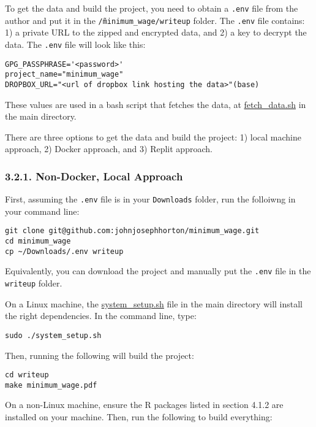 \documentclass[10pt]{article}
\begin{document}
To get the data and build the project, you need to obtain a \texttt{.env} file from the author and put it in the \texttt{\~/minimum\_wage/writeup} folder. 
The \texttt{.env} file contains: 1) a private URL to the zipped and encrypted data, and 2) a key to decrypt the data. 
The \texttt{.env} file will look like this:

\begin{verbatim}
GPG_PASSPHRASE='<password>'
project_name="minimum_wage"
DROPBOX_URL="<url of dropbox link hosting the data>"(base)
\end{verbatim}

These values are used in a bash script that fetches the data, at \href{https://www.github.com/johnjosephhorton/minimum_wage/blob/main/fetch_data.sh}{fetch\_data.sh} in the main directory.

There are three options to get the data and build the project: 1) local machine approach, 2) Docker approach, and 3) Replit approach.

\subsubsection*{3.2.1. Non-Docker, Local Approach}

First, assuming the \texttt{.env} file is in your \texttt{Downloads} folder, run the folloiwng in your command line:

\begin{verbatim}
git clone git@github.com:johnjosephhorton/minimum_wage.git
cd minimum_wage
cp ~/Downloads/.env writeup
\end{verbatim}

Equivalently, you can download the project and manually put the \texttt{.env} file in the \texttt{writeup} folder.

On a Linux machine, the \href{https://www.github.com/johnjosephhorton/minimum_wage/blob/main/system_setup.sh}{system\_setup.sh} file in the main directory will install the right dependencies. 
In the command line, type:

\begin{verbatim}
sudo ./system_setup.sh
\end{verbatim}

Then, running the following will build the project:

\begin{verbatim}
cd writeup 
make minimum_wage.pdf
\end{verbatim}

On a non-Linux machine, ensure the R packages listed in section 4.1.2 are installed on your machine. 
Then, run the following to build everything:
\end{document}
